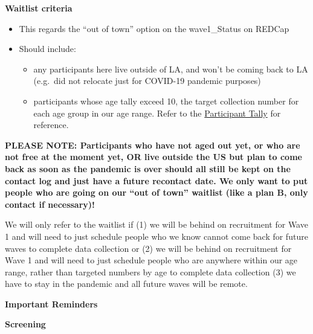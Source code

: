 \documentclass[]{book}
\providecommand{\tightlist}{%
  \setlength{\itemsep}{0pt}\setlength{\parskip}{0pt}}
\begin{document}
\textbf{Waitlist criteria}

\begin{itemize}
\tightlist
\item
  This regards the ``out of town'' option on the wave1\_Status on REDCap
\item
  Should include:

  \begin{itemize}
  \tightlist
  \item
    any participants here live outside of LA, and won't be coming back to LA (e.g.~did not relocate just for COVID-19 pandemic purposes)
  \item
    participants whose age tally exceed 10, the target collection number for each age group in our age range. Refer to the \href{https://ucla.app.box.com/file/724688028024}{Participant Tally} for reference.
  \end{itemize}
\end{itemize}

\textbf{PLEASE NOTE: Participants who have not aged out yet, or who are not free at the moment yet, OR live outside the US but plan to come back as soon as the pandemic is over should all still be kept on the contact log and just have a future recontact date. We only want to put people who are going on our ``out of town'' waitlist (like a plan B, only contact if necessary)!}

We will only refer to the waitlist if (1) we will be behind on recruitment for Wave 1 and will need to just schedule people who we know cannot come back for future waves to complete data collection or (2) we will be behind on recruitment for Wave 1 and will need to just schedule people who are anywhere within our age range, rather than targeted numbers by age to complete data collection (3) we have to stay in the pandemic and all future waves will be remote.

\textbf{Important Reminders}

\textbf{Screening}
\end{document}
